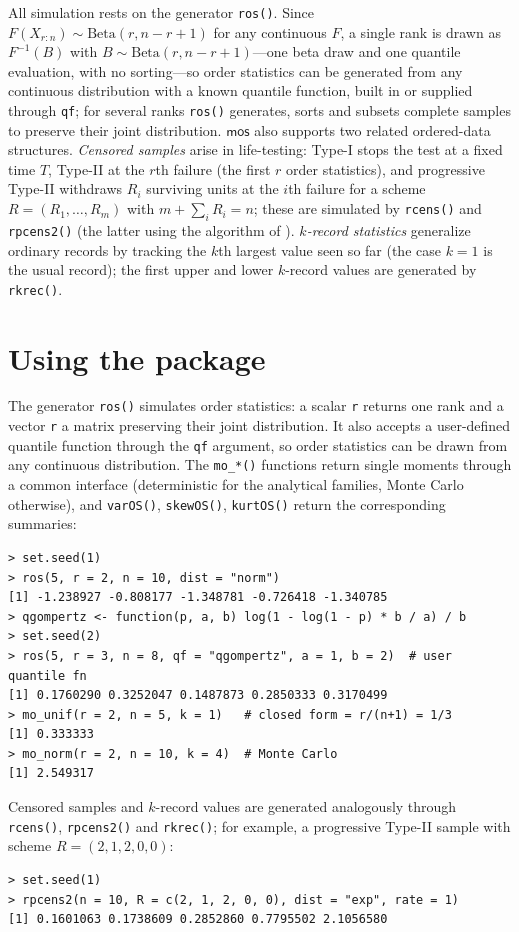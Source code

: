 \documentclass[twoside]{article}
\begin{document}
All simulation rests on the generator \texttt{ros()}. Since
$F(X_{r:n})\sim\mathrm{Beta}(r,n-r+1)$ for any continuous $F$, a single rank is
drawn as $F^{-1}(B)$ with $B\sim\mathrm{Beta}(r,n-r+1)$---one beta draw and one
quantile evaluation, with no sorting---so order statistics can be generated from
any continuous distribution with a known quantile function, built in or supplied
through \texttt{qf}; for several ranks \texttt{ros()} generates, sorts and subsets
complete samples to preserve their joint distribution. $\mathsf{mos}$ also supports
two related ordered-data structures. \emph{Censored samples}
\citep{BalakrishnanAggarwala2000} arise in life-testing: Type-I stops the test at a
fixed time $T$, Type-II at the $r$th failure (the first $r$ order statistics), and
progressive Type-II withdraws $R_i$ surviving units at the $i$th failure for a
scheme $R=(R_1,\ldots,R_m)$ with $m+\sum_i R_i=n$; these are simulated by
\texttt{rcens()} and \texttt{rpcens2()} (the latter using the algorithm of
\citep{BalakrishnanSandhu1995}). \emph{$k$-record statistics}
\citep{ArnoldBalakrishnanNagaraja1998} generalize ordinary records by tracking the
$k$th largest value seen so far (the case $k=1$ is the usual record); the first
upper and lower $k$-record values are generated by \texttt{rkrec()}.

\section{Using the package}\label{sec:usage}
The generator \texttt{ros()} simulates order statistics: a scalar \texttt{r}
returns one rank and a vector \texttt{r} a matrix preserving their joint
distribution. It also accepts a user-defined quantile function through the
\texttt{qf} argument, so order statistics can be drawn from any continuous
distribution. The \texttt{mo\_*()} functions return single moments through a
common interface (deterministic for the analytical families, Monte Carlo
otherwise), and \texttt{varOS()}, \texttt{skewOS()}, \texttt{kurtOS()} return the
corresponding summaries:
\par\smallskip
\begin{verbatim}
> set.seed(1)
> ros(5, r = 2, n = 10, dist = "norm")
[1] -1.238927 -0.808177 -1.348781 -0.726418 -1.340785
> qgompertz <- function(p, a, b) log(1 - log(1 - p) * b / a) / b
> set.seed(2)
> ros(5, r = 3, n = 8, qf = "qgompertz", a = 1, b = 2)  # user quantile fn
[1] 0.1760290 0.3252047 0.1487873 0.2850333 0.3170499
> mo_unif(r = 2, n = 5, k = 1)   # closed form = r/(n+1) = 1/3
[1] 0.333333
> mo_norm(r = 2, n = 10, k = 4)  # Monte Carlo
[1] 2.549317
\end{verbatim}
\par\smallskip
Censored samples and $k$-record values are generated analogously through
\texttt{rcens()}, \texttt{rpcens2()} and \texttt{rkrec()}; for example, a
progressive Type-II sample with scheme $R=(2,1,2,0,0)$:
\par\smallskip
\begin{verbatim}
> set.seed(1)
> rpcens2(n = 10, R = c(2, 1, 2, 0, 0), dist = "exp", rate = 1)
[1] 0.1601063 0.1738609 0.2852860 0.7795502 2.1056580
\end{verbatim}
\end{document}
